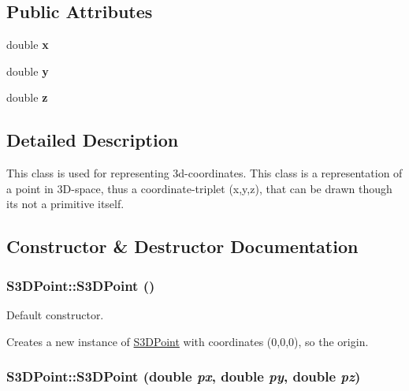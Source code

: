 \subsection*{Public Attributes}
\begin{DoxyCompactItemize}
\item 
\hypertarget{class_s3_d_point_ae6b39611c603bd43ea67bcf4438a932a}{
double {\bfseries x}}
\label{class_s3_d_point_ae6b39611c603bd43ea67bcf4438a932a}

\item 
\hypertarget{class_s3_d_point_a487ab6dfdcb00ddbf9485f0b71ad7fb5}{
double {\bfseries y}}
\label{class_s3_d_point_a487ab6dfdcb00ddbf9485f0b71ad7fb5}

\item 
\hypertarget{class_s3_d_point_ace7df3a87344170ddb4bfc92c3d5ec3d}{
double {\bfseries z}}
\label{class_s3_d_point_ace7df3a87344170ddb4bfc92c3d5ec3d}

\end{DoxyCompactItemize}


\subsection{Detailed Description}
This class is used for representing 3d-\/coordinates. This class is a representation of a point in 3D-\/space, thus a coordinate-\/triplet (x,y,z), that can be drawn though its not a primitive itself. 

\subsection{Constructor \& Destructor Documentation}
\hypertarget{class_s3_d_point_adad5537c6692acccab628a6bc105d20e}{
\subsubsection[{S3DPoint}]{\setlength{\rightskip}{0pt plus 5cm}S3DPoint::S3DPoint ()}}
\label{class_s3_d_point_adad5537c6692acccab628a6bc105d20e}


Default constructor. 

Creates a new instance of \hyperlink{class_s3_d_point}{S3DPoint} with coordinates (0,0,0), so the origin. \hypertarget{class_s3_d_point_ab03f0683b11340e8071eb8cdde1811b3}{
\subsubsection[{S3DPoint}]{\setlength{\rightskip}{0pt plus 5cm}S3DPoint::S3DPoint (double {\em px}, \/  double {\em py}, \/  double {\em pz})}}
\label{class_s3_d_point_ab03f0683b11340e8071eb8cdde1811b3}


